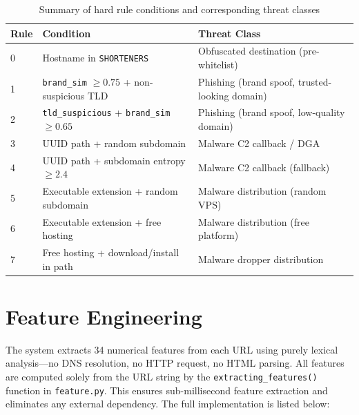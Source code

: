 \documentclass[12pt,a4paper]{article}
\begin{document}
\vspace{0.4cm}
\begin{table}[H]
    \centering
    \begin{tabularx}{\textwidth}{llX}
        \toprule
        \textbf{Rule} & \textbf{Condition} & \textbf{Threat Class} \\
        \midrule
        0 & Hostname in \texttt{SHORTENERS}                       & Obfuscated destination (pre-whitelist) \\
        1 & \texttt{brand\_sim} $\geq 0.75$ + non-suspicious TLD  & Phishing (brand spoof, trusted-looking domain) \\
        2 & \texttt{tld\_suspicious} + \texttt{brand\_sim} $\geq 0.65$ & Phishing (brand spoof, low-quality domain) \\
        3 & UUID path + random subdomain                          & Malware C2 callback / DGA \\
        4 & UUID path + subdomain entropy $\geq 2.4$              & Malware C2 callback (fallback) \\
        5 & Executable extension + random subdomain               & Malware distribution (random VPS) \\
        6 & Executable extension + free hosting                   & Malware distribution (free platform) \\
        7 & Free hosting + download/install in path               & Malware dropper distribution \\
        \bottomrule
    \end{tabularx}
    \caption{Summary of hard rule conditions and corresponding threat classes}
    \label{tab:hard_rules}
\end{table}

\section{Feature Engineering}
\label{sec:features}

The system extracts 34 numerical features from each URL using purely lexical analysis---no DNS resolution, no HTTP request, no HTML parsing. All features are computed solely from the URL string by the \texttt{extracting\_features()} function in \texttt{feature.py}. This ensures sub-millisecond feature extraction and eliminates any external dependency. The full implementation is listed below:
\end{document}
